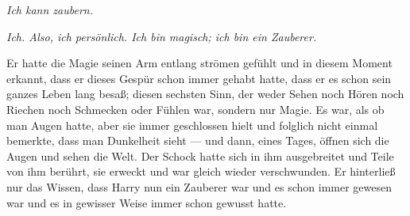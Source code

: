 \emph{Ich kann zaubern.}

\emph{Ich. Also, ich persönlich. Ich bin magisch; ich bin ein Zauberer.}

Er hatte die Magie seinen Arm entlang strömen gefühlt und in diesem Moment erkannt, dass er dieses Gespür schon immer gehabt hatte, dass er es schon sein ganzes Leben lang besaß; diesen sechsten Sinn, der weder Sehen noch Hören noch Riechen noch Schmecken oder Fühlen war, sondern nur Magie. Es war, als ob man Augen hatte, aber sie immer geschlossen hielt und folglich nicht einmal bemerkte, dass man Dunkelheit sieht — und dann, eines Tages, öffnen sich die Augen und sehen die Welt. Der Schock hatte sich in ihm ausgebreitet und Teile von ihm berührt, sie erweckt und war gleich wieder verschwunden. Er hinterließ nur das Wissen, dass Harry nun ein Zauberer war und es schon immer gewesen war und es in gewisser Weise immer schon gewusst hatte.

